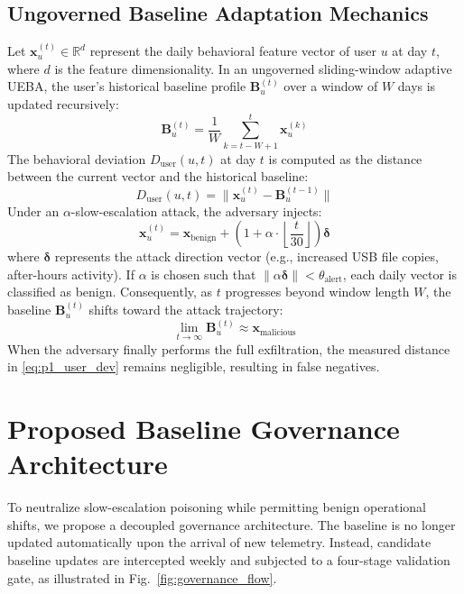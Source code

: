\documentclass[conference]{IEEEtran}
\begin{document}
\subsection{Ungoverned Baseline Adaptation Mechanics}
Let $\mathbf{x}_u^{(t)} \in \mathbb{R}^d$ represent the daily behavioral feature vector of user $u$ at day $t$, where $d$ is the feature dimensionality. In an ungoverned sliding-window adaptive UEBA, the user's historical baseline profile $\mathbf{B}_u^{(t)}$ over a window of $W$ days is updated recursively:
\begin{equation}
    \mathbf{B}_u^{(t)} = \frac{1}{W} \sum_{k=t-W+1}^{t} \mathbf{x}_u^{(k)}
    \label{eq:p1_baseline_mean}
\end{equation}
The behavioral deviation $D_{\text{user}}(u, t)$ at day $t$ is computed as the distance between the current vector and the historical baseline:
\begin{equation}
    D_{\text{user}}(u, t) = \|\mathbf{x}_u^{(t)} - \mathbf{B}_u^{(t-1)}\|
    \label{eq:p1_user_dev}
\end{equation}
Under an $\alpha$-slow-escalation attack, the adversary injects:
\begin{equation}
    \mathbf{x}_u^{(t)} = \mathbf{x}_{\text{benign}} + \left(1 + \alpha \cdot \left\lfloor \frac{t}{30} \right\rfloor \right) \boldsymbol{\delta}
    \label{eq:p1_attack_injection}
\end{equation}
where $\boldsymbol{\delta}$ represents the attack direction vector (e.g., increased USB file copies, after-hours activity). If $\alpha$ is chosen such that $\|\alpha \boldsymbol{\delta}\| < \theta_{\text{alert}}$, each daily vector is classified as benign. Consequently, as $t$ progresses beyond window length $W$, the baseline $\mathbf{B}_u^{(t)}$ shifts toward the attack trajectory:
\begin{equation}
    \lim_{t \to \infty} \mathbf{B}_u^{(t)} \approx \mathbf{x}_{\text{malicious}}
    \label{eq:p1_baseline_limit}
\end{equation}
When the adversary finally performs the full exfiltration, the measured distance in \eqref{eq:p1_user_dev} remains negligible, resulting in false negatives.

\section{Proposed Baseline Governance Architecture}
\label{sec:architecture}

To neutralize slow-escalation poisoning while permitting benign operational shifts, we propose a decoupled governance architecture. The baseline is no longer updated automatically upon the arrival of new telemetry. Instead, candidate baseline updates are intercepted weekly and subjected to a four-stage validation gate, as illustrated in Fig.~\ref{fig:governance_flow}.
\end{document}
